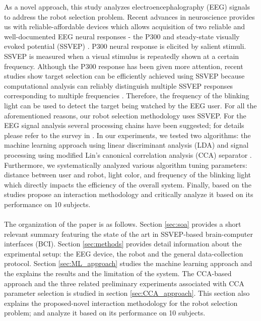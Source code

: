 \documentclass{svmult}
\begin{document}
As a novel approach, this study analyzes electroencephalography (EEG) signals to address the robot selection problem. Recent advances in neuroscience provides us with reliable-affordable devices which allows acquisition of two reliable and well-documented EEG neural responses - the P300 and steady-state visually evoked potential (SSVEP) \cite{Zhu2010, Bi2013, Beverina2003}. P300 neural response is elicited by salient stimuli. SSVEP is measured when a visual stimulus is repeatedly shown at a certain frequency. Although the P300 response has been given more attention, recent studies show target selection can be efficiently achieved using SSVEP because computational analysis can reliably distinguish multiple SSVEP responses corresponding to multiple frequencies \cite{SSVEPfiability}. Therefore, the frequency of the blinking light can be used to detect the target being watched by the EEG user. For all the aforementioned reasons, our robot selection methodology uses SSVEP. For the EEG signal analysis several processing chains have been suggested; for details please refer to the survey in \cite{Bi2013}. In our experiments, we tested two algorithms: the machine learning approach using linear discriminant analysis (LDA) \cite{openvibeSSVEP} and signal processing using modified Lin's canonical correlation analysis (CCA) separator \cite{Lin2014}. Furthermore, we systematically analyzed various algorithm tuning parameters: distance between user and robot, light color, and frequency of the blinking light which directly impacts the efficiency of the overall system. Finally, based on the studies propose an interaction methodology and critically analyze it based on its performance on 10 subjects.\\
\\
The organization of the paper is as follows. Section \ref{sec:soa} provides a short relevant summary featuring the state of the art in SSVEP-based brain-computer interfaces (BCI). Section \ref{sec:methods} provides detail information about the exprimental setup: the EEG device, the robot and the general data-collection protocol. Section \ref{sec:ML_approach} studies the machine learning approach and the explains the results and the limitation of the system. The CCA-based approach and the three related preliminary experiments associated with CCA parameter selection is studied in section \ref{sec:CCA_approach}. This section also explains the proposed-novel interaction methodology for the robot selection problem; and analyze it based on its performance on 10 subjects. 
\end{document}

